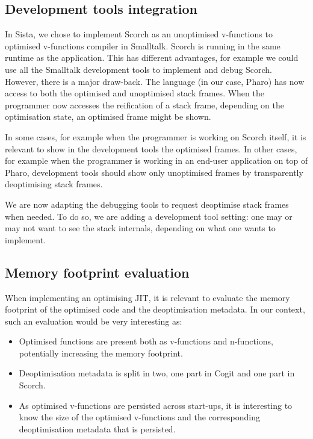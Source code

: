 \documentclass[a4paper,12pt,twoside]{../includes/ThesisStyle}
\begin{document}
\subsection{Development tools integration}
\label{ss:FWIDE}

In Sista, we chose to implement Scorch as an unoptimised v-functions to optimised v-functions compiler in Smalltalk. Scorch is running in the same runtime as the application. This has different advantages, for example we could use all the Smalltalk development tools to implement and debug Scorch. However, there is a major draw-back. The language (in our case, Pharo) has now access to both the optimised and unoptimised stack frames. When the programmer now accesses the reification of a stack frame, depending on the optimisation state, an optimised frame might be shown. 

In some cases, for example when the programmer is working on Scorch itself, it is relevant to show in the development tools the optimised frames. In other cases, for example when the programmer is working in an end-user application on top of Pharo, development tools should show only unoptimised frames by transparently deoptimising stack frames.

We are now adapting the debugging tools to request deoptimise stack frames when needed. To do so, we are adding a development tool setting: one may or may not want to see the stack internals, depending on what one wants to implement.

\subsection{Memory footprint evaluation}
\label{ss:FWMemFootprint}

When implementing an optimising JIT, it is relevant to evaluate the memory footprint of the optimised code and the deoptimisation metadata. In our context, such an evaluation would be very interesting as:
\begin{itemize}
	\item Optimised functions are present both as v-functions and n-functions, potentially increasing the memory footprint.
	\item Deoptimisation metadata is split in two, one part in Cogit and one part in Scorch.
	\item As optimised v-functions are persisted across start-ups, it is interesting to know the size of the optimised v-functions and the corresponding deoptimisation metadata that is persisted.
\end{itemize}
\end{document}
